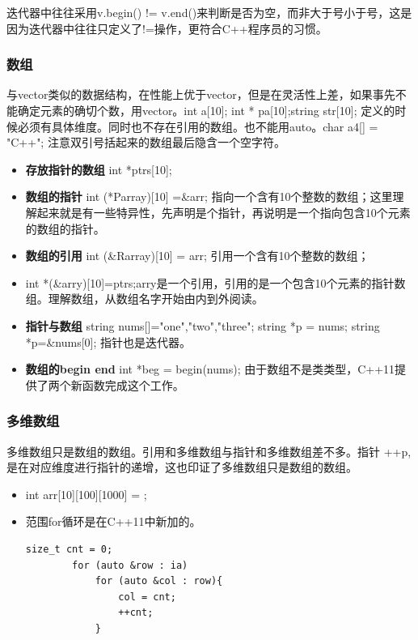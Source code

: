 \begin{tcolorbox}[boxsep=-0.05in]
	迭代器中往往采用v.begin() != v.end()来判断是否为空，而非大于号小于号，这是因为迭代器中往往只定义了!=操作，更符合C++程序员的习惯。
\end{tcolorbox}

\subsubsection{数组}
与vector类似的数据结构，在性能上优于vector，但是在灵活性上差，如果事先不能确定元素的确切个数，用vector。int a[10]; int * pa[10];string str[10]; 定义的时候必须有具体维度。同时也不存在引用的数组。也不能用auto。char a4[] = "C++"; 注意双引号括起来的数组最后隐含一个空字符。
\begin{itemize}
	\item \textbf{存放指针的数组} int *ptrs[10];
	\item \textbf{数组的指针} int (*Parray)[10] =\&arr; 指向一个含有10个整数的数组；这里理解起来就是有一些特异性，先声明是个指针，再说明是一个指向包含10个元素的数组的指针。
	\item \textbf{数组的引用} int (\&Rarray)[10] = arr; 引用一个含有10个整数的数组；
	\item int *(\&arry)[10]=ptrs;arry是一个引用，引用的是一个包含10个元素的指针数组。理解数组，从数组名字开始由内到外阅读。
	\item \textbf{指针与数组} string nums[]={"one","two","three"}; string *p = nums; string *p=\&nums[0]; 指针也是迭代器。
	\item \textbf{数组的begin end} int *beg = begin(nums); 由于数组不是类类型，C++11提供了两个新函数完成这个工作。
\end{itemize}

\subsubsection{多维数组}
多维数组只是数组的数组。引用和多维数组与指针和多维数组差不多。指针 ++p,是在对应维度进行指针的递增，这也印证了多维数组只是数组的数组。
\begin{itemize}
	\item int arr[10][100][1000] = {};
	\item {范围for循环}是在C++11中新加的。
	\begin{lstlisting}[caption={}]
		size_t cnt = 0;
		for (auto &row : ia)
			for (auto &col : row){
				col = cnt;
				++cnt;
			}
	\end{lstlisting}
\end{itemize}

